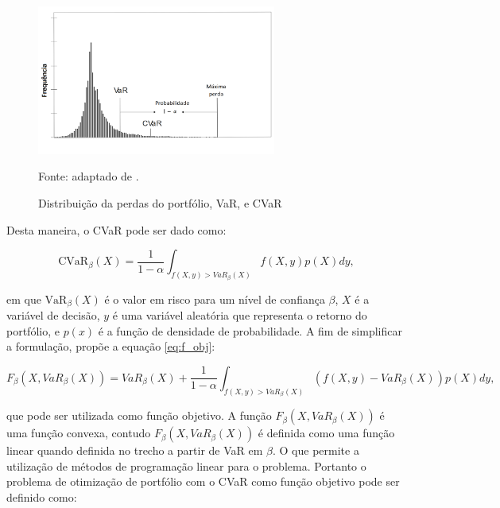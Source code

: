                     \begin{figure}[H]
                        \centering
                        \caption{Distribuição da perdas do portfólio, VaR, e CVaR}
                        \label{fig:CVaR}
                        \includegraphics[width=0.7\textwidth]{./imagens/CVaR.png}
                        \par \footnotesize Fonte: adaptado de .
                    \end{figure}

                    Desta maneira, o CVaR pode ser dado como:

                    \begin{equation}
                        \label{eq:CVaR}
                        \text{CVaR}_{\beta}(X)=\frac{1}{1-\alpha} \int_{f(X,y)>VaR_{\beta}(X)} f(X,y) p(X) dy,
                    \end{equation}

                    \noindent em que $\text{VaR}_{\beta}(X)$ é o valor em risco para um nível de confiança $\beta$, $X$ é a variável de decisão, $y$ é uma variável aleatória que representa o retorno do portfólio, e $p(x)$ é a função de densidade de probabilidade. A fim de simplificar a formulação,  propõe a equação \eqref{eq:f_obj}:

                    \begin{equation}
                        \label{eq:f_obj}
                        F_{\beta}(X,VaR_{\beta}(X))=VaR_{\beta}(X)+\frac{1}{1-\alpha} \int_{f(X,y)>VaR_{\beta}(X)} (f(X,y)-VaR_{\beta}(X)) p(X) dy,
                    \end{equation}

                    \noindent que pode ser utilizada como função objetivo. A função $F_{\beta}(X,VaR_{\beta}(X))$ é uma função convexa, contudo $F_{\beta}(X,VaR_{\beta}(X))$ é definida como uma função linear quando definida no trecho a partir de VaR em $\beta$. O que permite a utilização de métodos de programação linear para o problema. Portanto o problema de otimização de portfólio com o \acrshort{CVaR} como função objetivo pode ser definido como:

